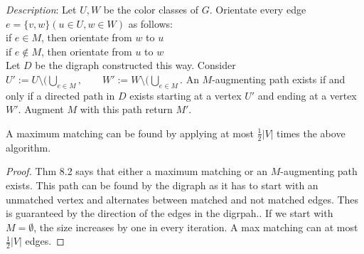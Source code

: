 \emph{Description}: Let $U,W$ be the color classes of $G$. Orientate every edge $e=\{v,w\} (u \in U, w \in W)$ as follows: \\
if $e \in M$, then orientate from $w$ to $u$ \\
if $e \notin M$, then orientate from $u$ to $w$ \\
Let $D$ be the digraph constructed this way. Consider $U':=U \setminus (\bigcup\limits_{e \in M}, \qquad W':=W \setminus (\bigcup\limits_{e \in M}$. An $M$-augmenting path exists if and only if a directed path in $D$ exists starting at a vertex $U'$ and ending at a vertex $W'$. Augment $M$ with this path return $M'$.

\begin{thm}
A maximum matching can be found by applying at most $\frac{1}{2} |V| $ times the above algorithm.
\end{thm}
\begin{proof} Thm 8.2 %
says that either a maximum matching or an $M$-augmenting path exists. This path can be found by the digraph as it has to start with an unmatched vertex and alternates between matched and not matched edges. Thes is guaranteed by the direction of the edges in the digrpah.. If we start with $M = \emptyset$, the size increases by one in every iteration. A max matching can at most $\frac{1}{2} |V|$ edges.
\end{proof}

